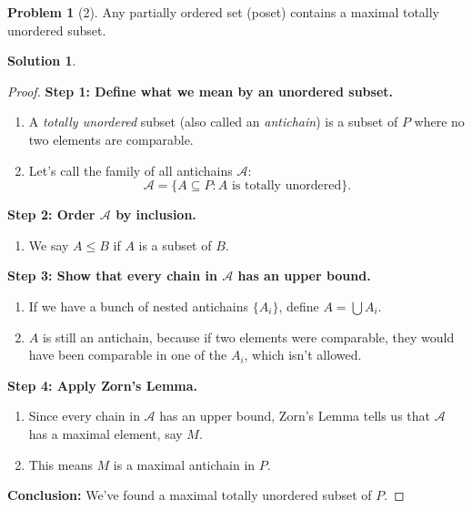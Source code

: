 \documentclass[12pt]{article}
\theoremstyle{definition} %
\newtheorem{solution}{Solution}
\newtheorem{problem}{Problem}
\theoremstyle{plain} %
\begin{document}
\begin{problem}[2]
    Any partially ordered set (poset) contains a maximal totally unordered subset.
\end{problem}
\begin{solution}
    \begin{proof}
    \textbf{Step 1: Define what we mean by an unordered subset.}
    
    \begin{enumerate}
        \item A \emph{totally unordered} subset (also called an \emph{antichain}) is a subset of $P$ where no two elements are comparable.
        \item Let’s call the family of all antichains $\mathcal{A}$:
        \[
            \mathcal{A} = \{ A \subseteq P : A \text{ is totally unordered} \}.
        \]
    \end{enumerate}
    
    \textbf{Step 2: Order $\mathcal{A}$ by inclusion.}
    
    \begin{enumerate}
        \item We say $A \leq B$ if $A$ is a subset of $B$.
    \end{enumerate}
    
    \textbf{Step 3: Show that every chain in $\mathcal{A}$ has an upper bound.}
    
    \begin{enumerate}
        \item If we have a bunch of nested antichains $\{A_i\}$, define $A = \bigcup A_i$.
        \item $A$ is still an antichain, because if two elements were comparable, they would have been comparable in one of the $A_i$, which isn’t allowed.
    \end{enumerate}
    
    \textbf{Step 4: Apply Zorn’s Lemma.}
    
    \begin{enumerate}
        \item Since every chain in $\mathcal{A}$ has an upper bound, Zorn’s Lemma tells us that $\mathcal{A}$ has a maximal element, say $M$.
        \item This means $M$ is a maximal antichain in $P$.
    \end{enumerate}
    
    \textbf{Conclusion:} We’ve found a maximal totally unordered subset of $P$.
    \end{proof}
\end{solution}
\end{document}
